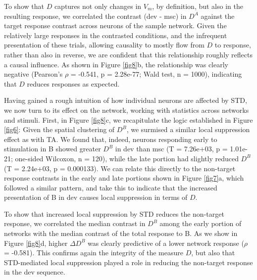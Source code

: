 \documentclass[pdflatex,referee,iicol,sn-basic]{sn-jnl}
\theoremstyle{thmstyleone}%
\theoremstyle{thmstyletwo}%
\theoremstyle{thmstylethree}%
\begin{document}
To show that $D$ captures not only changes in $V_m$, by definition, but also in the resulting response, we correlated the contrast (dev - msc) in $D^A$ against the target response contrast across neurons of the sample network. Given the relatively large responses in the contrasted conditions, and the infrequent presentation of these trials, allowing causality to mostly flow from $D$ to response, rather than also in reverse, we are confident that this relationship roughly reflects a causal influence. As shown in Figure \ref{fig8}b, the relationship was clearly negative (Pearson's $\rho$ = -0.541, p = 2.28e-77; Wald test, n = 1000), indicating that $D$ reduces responses as expected.

Having gained a rough intuition of how individual neurons are affected by STD, we now turn to its effect on the network, working with statistics across networks and stimuli. First, in Figure \ref{fig8}c, we recapitulate the logic established in Figure \ref{fig6}: Given the spatial clustering of $D^B$, we surmised a similar local suppression effect as with TA. We found that, indeed, neurons responding early to stimulation in B showed greater $D^B$ in dev than msc (T = 7.26e+03, p = 1.01e-21; one-sided Wilcoxon, n = 120), while the late portion had slightly reduced $D^B$ (T = 2.24e+03, p = 0.000133). We can relate this directly to the non-target response contrasts in the early and late portions shown in Figure \ref{fig7}a, which followed a similar pattern, and take this to indicate that the increased presentation of B in dev causes local suppression in terms of $D$. %

To show that increased local suppression by STD reduces the non-target response, we correlated the median contrast in $D^B$ among the early portion of networks with the median contrast of the total response to B. As we show in Figure \ref{fig8}d, higher $\Delta D^B$ was clearly predictive of a lower network response ($\rho$ = -0.581). This confirms again the integrity of the measure $D$, but also that STD-mediated local suppression played a role in reducing the non-target response in the dev sequence. %
\end{document}
